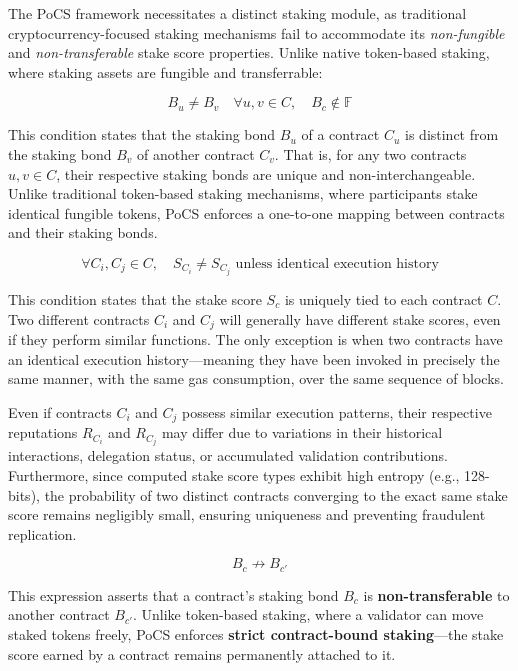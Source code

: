 \documentclass{article}
\begin{document}
The PoCS framework necessitates a distinct staking module, as traditional cryptocurrency-focused staking mechanisms fail to accommodate its \textit{non-fungible} and \textit{non-transferable} stake score properties. Unlike native token-based staking, where staking assets are fungible and transferrable:  

\begin{equation}
B_u \neq B_v \quad \forall u,v \in C, \quad B_c \notin \mathbb{F}
\end{equation}

This condition states that the staking bond $B_u$ of a contract $C_u$ is distinct from the staking bond $B_v$ of another contract $C_v$. That is, for any two contracts $u, v \in C$, their respective staking bonds are unique and non-interchangeable. Unlike traditional token-based staking mechanisms, where participants stake identical fungible tokens, PoCS enforces a one-to-one mapping between contracts and their staking bonds.

\begin{equation}
\forall C_i, C_j \in C, \quad S_{C_i} \neq S_{C_j} \text{ unless identical execution history}
\end{equation}

This condition states that the stake score \( S_c \) is uniquely tied to each contract \( C \). Two different contracts \( C_i \) and \( C_j \) will generally have different stake scores, even if they perform similar functions. The only exception is when two contracts have an identical execution history—meaning they have been invoked in precisely the same manner, with the same gas consumption, over the same sequence of blocks.  

Even if contracts \( C_i \) and \( C_j \) possess similar execution patterns, their respective reputations \( R_{C_i} \) and \( R_{C_j} \) may differ due to variations in their historical interactions, delegation status, or accumulated validation contributions. Furthermore, since computed stake score types exhibit high entropy (e.g., 128-bits), the probability of two distinct contracts converging to the exact same stake score remains negligibly small, ensuring uniqueness and preventing fraudulent replication.  

\begin{equation}
B_c \not\rightarrow B_{c'}
\end{equation}

This expression asserts that a contract’s staking bond \( B_c \) is \textbf{non-transferable} to another contract \( B_{c'} \). Unlike token-based staking, where a validator can move staked tokens freely, PoCS enforces \textbf{strict contract-bound staking}—the stake score earned by a contract remains permanently attached to it.
\end{document}
